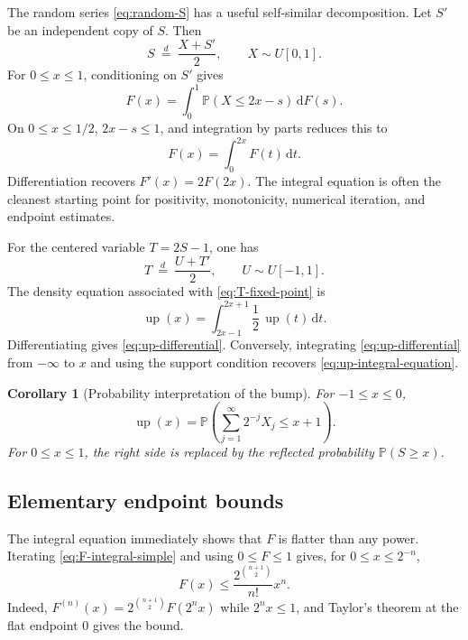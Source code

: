 \documentclass[11pt]{article}
\numberwithin{equation}{section}
\newtheorem{corollary}[theorem]{Corollary}
\theoremstyle{definition}
\theoremstyle{remark}
\newcommand{\upf}{\operatorname{up}}
\newcommand{\dd}{\,\mathrm d}
\begin{document}
The random series \eqref{eq:random-S} has a useful self-similar decomposition.  Let $S'$ be an independent copy of $S$.  Then
\begin{equation}\label{eq:S-fixed-point}
 S\ \stackrel{d}{=}\ \frac{X+S'}2,
 \qquad X\sim U[0,1].
\end{equation}
For $0\le x\le1$, conditioning on $S'$ gives
\begin{equation}\label{eq:F-integral-fixed-point}
 F(x)=\int_0^1\mathbb P(X\le2x-s)\dd F(s).
\end{equation}
On $0\le x\le1/2$, $2x-s\le1$, and integration by parts reduces this to
\begin{equation}\label{eq:F-integral-simple}
 F(x)=\int_0^{2x}F(t)\dd t.
\end{equation}
Differentiation recovers $F'(x)=2F(2x)$.  The integral equation is often the cleanest starting point for positivity, monotonicity, numerical iteration, and endpoint estimates.

For the centered variable $T=2S-1$, one has
\begin{equation}\label{eq:T-fixed-point}
 T\ \stackrel{d}{=}\ \frac{U+T'}2,
 \qquad U\sim U[-1,1].
\end{equation}
The density equation associated with \eqref{eq:T-fixed-point} is
\begin{equation}\label{eq:up-integral-equation}
 \upf(x)=\int_{2x-1}^{2x+1}\frac12\,\upf(t)\dd t.
\end{equation}
Differentiating gives \eqref{eq:up-differential}.  Conversely, integrating \eqref{eq:up-differential} from $-\infty$ to $x$ and using the support condition recovers \eqref{eq:up-integral-equation}.

\begin{corollary}[Probability interpretation of the bump]\label{cor:up-probability}
For $-1\le x\le0$,
\begin{equation}\label{eq:up-CDF}
 \upf(x)=\mathbb P\!\left(\sum_{j=1}^{\infty}2^{-j}X_j\le x+1\right).
\end{equation}
For $0\le x\le1$, the right side is replaced by the reflected probability $\mathbb P(S\ge x)$.
\end{corollary}

\subsection{Elementary endpoint bounds}

The integral equation immediately shows that $F$ is flatter than any power.  Iterating \eqref{eq:F-integral-simple} and using $0\le F\le1$ gives, for $0\le x\le2^{-n}$,
\begin{equation}\label{eq:basic-flat-bound}
 F(x)\le \frac{2^{\binom{n+1}{2}}}{n!}x^n.
\end{equation}
Indeed, $F^{(n)}(x)=2^{\binom{n+1}{2}}F(2^nx)$ while $2^nx\le1$, and Taylor's theorem at the flat endpoint $0$ gives the bound.
\end{document}

